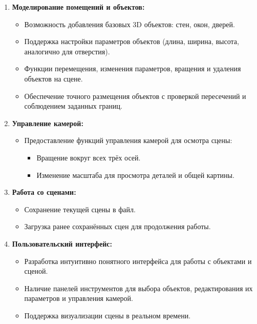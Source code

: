 \begin{enumerate}
    \item \textbf{Моделирование помещений и объектов:}
    \begin{itemize}
        \item Возможность добавления базовых 3D объектов: стен, окон, дверей.
        \item Поддержка настройки параметров объектов (длина, ширина, высота, аналогично для отверстия).
        \item Функции перемещения, изменения параметров, вращения и удаления объектов на сцене.
        \item Обеспечение точного размещения объектов с проверкой пересечений и соблюдением заданных границ.
    \end{itemize}
    
    \item \textbf{Управление камерой:}
    \begin{itemize}
        \item Предоставление функций управления камерой для осмотра сцены:
        \begin{itemize}
            \item Вращение вокруг всех трёх осей.
            \item Изменение масштаба для просмотра деталей и общей картины.
        \end{itemize}
    \end{itemize}
    
    \item \textbf{Работа со сценами:}
    \begin{itemize}
        \item Сохранение текущей сцены в файл.
        \item Загрузка ранее сохранённых сцен для продолжения работы.
    \end{itemize}
    
    \item \textbf{Пользовательский интерфейс:}
    \begin{itemize}
        \item Разработка интуитивно понятного интерфейса для работы с объектами и сценой.
        \item Наличие панелей инструментов для выбора объектов, редактирования их параметров и управления камерой.
        \item Поддержка визуализации сцены в реальном времени.
    \end{itemize}
    

\end{enumerate}
